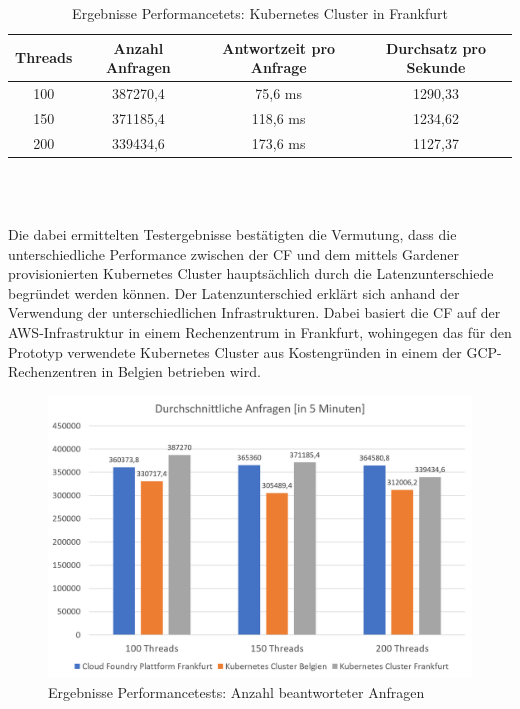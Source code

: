 \begin{description}
	\begin{table}[ht]
		\centering
		\begin{tabular}[h]{c|c|c|c}
			Threads & Anzahl Anfragen & Antwortzeit pro Anfrage & Durchsatz pro Sekunde \\
			\hline
			100 & 387270,4 & 75,6 ms & 1290,33 
			\\
			\hline
			150 & 371185,4 & 118,6 ms & 1234,62
			\\
			\hline
			200 & 339434,6 & 173,6 ms & 1127,37
			\\
		\end{tabular}\\
		\caption{Ergebnisse Performancetets: Kubernetes Cluster in Frankfurt}
	\end{table}
	\\
	Die dabei ermittelten Testergebnisse bestätigten die Vermutung, dass die unterschiedliche Performance zwischen der \ac{CF} und dem mittels Gardener provisionierten Kubernetes Cluster hauptsächlich durch die Latenzunterschiede begründet werden können.	Der Latenzunterschied erklärt sich anhand der Verwendung der unterschiedlichen Infrastrukturen. Dabei basiert die \ac{CF} auf der \ac{AWS}-Infrastruktur in einem Rechenzentrum in Frankfurt, wohingegen das für den Prototyp verwendete Kubernetes Cluster aus Kostengründen in einem der \ac{GCP}-Rechenzentren in Belgien betrieben wird.
	\\
	\begin{figure}[h]
		\begin{center}
			\includegraphics[width=13cm]{img/Performance_Response_Amount.PNG}
			\caption[Ergebnisse Performancetests: Anzahl beantworteter Anfragen]{Ergebnisse Performancetests: Anzahl beantworteter Anfragen}
			\label{performance_anzahl_antworten}

\end{center}
\end{figure}
\end{description}
